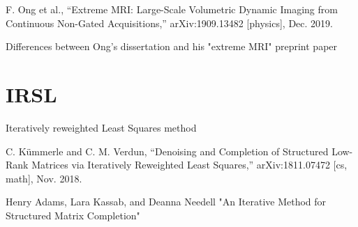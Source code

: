 F. Ong et al., “Extreme MRI: Large-Scale Volumetric Dynamic Imaging from Continuous Non-Gated Acquisitions,” arXiv:1909.13482 [physics], Dec. 2019.

Differences between Ong's dissertation and his "extreme MRI" preprint paper

\section{IRSL}
Iteratively reweighted Least Squares method

C. Kümmerle and C. M. Verdun, “Denoising and Completion of Structured Low-Rank Matrices via Iteratively Reweighted Least Squares,” arXiv:1811.07472 [cs, math], Nov. 2018.

Henry Adams, Lara Kassab, and Deanna Needell "An Iterative Method for Structured Matrix Completion"

\clearpage %